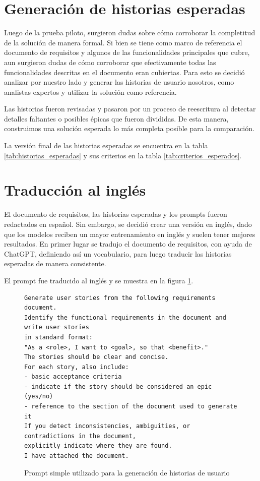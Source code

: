 \section{Generación de historias esperadas}

Luego de la prueba piloto, surgieron dudas sobre cómo corroborar la completitud de la solución de manera formal. Si bien se tiene como marco de referencia el documento de requisitos y algunos de las funcionalidades principales que cubre, aun surgieron dudas de cómo corroborar que efectivamente todas las funcionalidades descritas en el documento eran cubiertas. Para esto se decidió analizar por nuestro lado y generar las historias de usuario nosotros, como analistas expertos y utilizar la solución como referencia.

Las historias fueron revisadas y pasaron por un proceso de reescritura al detectar detalles faltantes o posibles épicas que fueron divididas. De esta manera, construimos una solución esperada lo más completa posible para la comparación.

La versión final de las historias esperadas se encuentra en la tabla \ref{tab:historias_esperadas} y sus criterios en la tabla \ref{tab:criterios_esperados}.

\section{Traducción al inglés}
El documento de requisitos, las historias esperadas y los prompts fueron redactados en español. Sin embargo, se decidió crear una versión en inglés, dado que los modelos reciben un mayor entrenamiento en inglés \cite{zhang2023multilingualLLM} y suelen tener mejores resultados. En primer lugar se tradujo el documento de requisitos, con ayuda de ChatGPT, definiendo así un vocabulario, para luego traducir las historias esperadas de manera consistente.

El prompt fue traducido al inglés y se muestra en la figura \ref{fig:prompt_simple}.

\begin{figure}[h!]
\begin{verbatim}
Generate user stories from the following requirements document.
Identify the functional requirements in the document and write user stories
in standard format:
"As a <role>, I want to <goal>, so that <benefit>."
The stories should be clear and concise.
For each story, also include:
- basic acceptance criteria
- indicate if the story should be considered an epic (yes/no)
- reference to the section of the document used to generate it
If you detect inconsistencies, ambiguities, or contradictions in the document,
explicitly indicate where they are found.
I have attached the document.
\end{verbatim}
\caption{Prompt simple utilizado para la generación de historias de usuario}
\label{fig:prompt_simple}
\end{figure}

